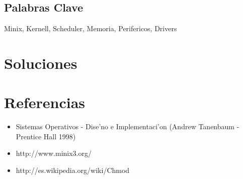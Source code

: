 \documentclass[spanish, a4paper, 11pt]{article}
\begin{document}
\subtitulo{}
\maketitle

\subsection*{Palabras Clave}
Minix, Kernell, Scheduler, Memoria, Perifericos, Drivers

\clearpage
\tableofcontents
\newpage

\section{Soluciones}














\clearpage
\section{Referencias}
\begin{itemize}
\item Sistemas Operativos - Dise'no e Implementaci'on (Andrew Tanenbaum - Prentice Hall 1998)
\item http://www.minix3.org/
\item http://es.wikipedia.org/wiki/Chmod
\end{itemize}
\end{document}
